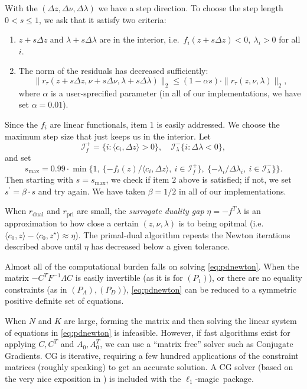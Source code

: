 \documentclass{article}
\newcommand{\dz}{\Delta z}
\newcommand{\dlam}{\Delta\lambda}
\newcommand{\dnu}{\Delta\nu}
\newcommand{\packname}{{\sc $\ell_1$-magic}\ }
\newcommand{\<}{\langle}
\renewcommand{\>}{\rangle}
\begin{document}
With the $(\dz,\dnu,\dlam)$ we have a step direction.  To choose the step length $0<s\leq 1$, we ask that it satisfy two criteria:
\begin{enumerate}
\item $z+s\dz$ and $\lambda+s\dlam$ are in the interior, i.e.\ $f_i(z+s\dz)<0,~\lambda_i > 0$ for all $i$. 
%
\item The norm of the residuals has decreased sufficiently:
\[
\|r_\tau(z+s\dz,\nu+s\dnu,\lambda+s\dlam)\|_2 \leq (1-\alpha s)\cdot\|r_\tau(z,\nu,\lambda) \|_2,
\]
where $\alpha$ is a user-sprecified parameter (in all of our implementations, we have set $\alpha=0.01$).
\end{enumerate}
Since the $f_i$ are linear functionals, item $1$ is easily addressed.
We choose the maximum step size that just keeps us in the interior.  Let 
\[
\mathcal{I}^+_f = \{i : \<c_i,\dz\> > 0\},\quad
\mathcal{I}^-_\lambda \{i : \dlam < 0\},
\]
and set
\[
s_{\mathrm{max}} = 0.99\cdot\min\{1,~ 
\{-f_i(z)/\<c_i,\dz\>,~i\in\mathcal{I}^+_f\},~
\{-\lambda_i/\dlam_i,~i\in\mathcal{I}^-_\lambda\}\}.
\] 
Then starting with $s=s_{\mathrm{max}}$, we check if item $2$ above is satisfied; if not, we set $s^\prime = \beta\cdot s$ and try again.
We have taken $\beta=1/2$ in all of our implementations.

When $r_{\mathrm{dual}}$ and $r_{\mathrm{pri}}$ are small, the {\em surrogate duality gap} $\eta = -f^T\lambda$ is an approximation to how close a certain $(z,\nu,\lambda)$ is to being opitmal 
(i.e.\ $\<c_0,z\>-\<c_0,z^\star\>\approx\eta$).  The primal-dual algorithm repeats the Newton iterations described above until $\eta$ has decreased below a given tolerance.

Almost all of the computational burden falls on solving \eqref{eq:pdnewton}.  When the matrix $-C^TF^{-1}\Lambda C$ is easily invertible (as it is for $(P_1)$), or there are no equality constraints (as in $(P_A),(P_D)$), \eqref{eq:pdnewton} can be reduced to a symmetric positive definite set of equations.

When $N$ and $K$ are large, forming the matrix and then solving the linear system of equations in \eqref{eq:pdnewton} is infeasible.  However, if fast algorithms exist for applying $C,C^T$ and $A_0,A_0^T$, we can use a ``matrix free'' solver such as Conjugate Gradients.  CG is iterative, requiring a few hundred applications of 
the constraint matrices (roughly speaking) to get an accurate solution.  A CG solver (based on the very nice exposition in \cite{shewchuk94in}) is included with the \packname package. 
  
\end{document}
